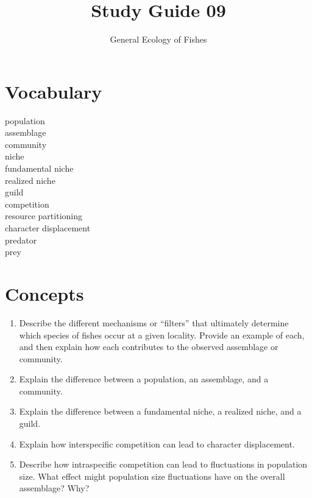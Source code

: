 \documentclass[letterpaper]{tufte-handout}
\title{Study Guide 09}
\author{General Ecology of Fishes}
\date{} %
\begin{document}
\maketitle	%


\section{Vocabulary} 
\vspace{-1\baselineskip}
\begin{multicols}{2}
population \\
assemblage \\
community \\
niche \\
fundamental niche \\
realized niche \\
guild \\
competition \\
resource partitioning \\
character displacement \\
predator \\
prey
\end{multicols}

\section{Concepts}

\begin{enumerate}
	\item Describe the different mechanisms or “filters” that ultimately determine which species of fishes occur at a given locality.  Provide an example of each, and then explain how each contributes to the observed assemblage or community.

	\item Explain the difference between a population, an assemblage, and a community.

	\item Explain the difference between a fundamental niche, a realized niche, and a guild.   

	\item Explain how interspecific competition can lead to character displacement.

	\item Describe how intraspecific competition can lead to fluctuations in population size.  What effect might population size fluctuations have on the overall assemblage?  Why?

\end{enumerate}
\end{document}
